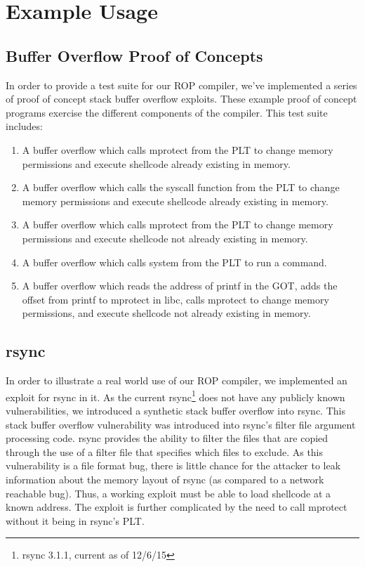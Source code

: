 \documentclass[journal]{IEEEtran}
\begin{document}
\section{Example Usage}\label{examples}

\subsection{Buffer Overflow Proof of Concepts}
In order to provide a test suite for our ROP compiler, we've implemented a series of proof of concept stack buffer overflow exploits.
These example proof of concept programs exercise the different components of the compiler.
This test suite includes:
\begin{enumerate}
  \item A buffer overflow which calls mprotect from the PLT to change memory permissions and execute shellcode already existing in memory.
  \item A buffer overflow which calls the syscall function from the PLT to change memory permissions and execute shellcode already existing in memory.
  \item A buffer overflow which calls mprotect from the PLT to change memory permissions and execute shellcode not already existing in memory.
  \item A buffer overflow which calls system from the PLT to run a command.
  \item A buffer overflow which reads the address of printf in the GOT, adds the offset from printf to mprotect in libc, calls
  mprotect to change memory permissions, and execute shellcode not already existing in memory.
\end{enumerate}

\subsection{rsync}
In order to illustrate a real world use of our ROP compiler, we implemented an exploit for rsync in it.
As the current rsync\footnote{rsync 3.1.1, current as of 12/6/15} does not have any publicly known vulnerabilities, we introduced a synthetic stack buffer overflow into rsync.
This stack buffer overflow vulnerability was introduced into rsync's filter file argument processing code.
rsync provides the ability to filter the files that are copied through the use of a filter file that specifies which files to exclude.
As this vulnerability is a file format bug, there is little chance for the attacker to leak information about the memory layout of rsync (as compared to a network reachable bug).
Thus, a working exploit must be able to load shellcode at a known address.
The exploit is further complicated by the need to call mprotect without it being in rsync's PLT.
\end{document}
